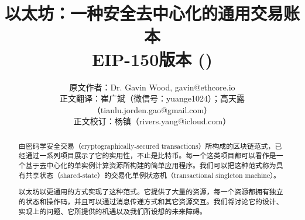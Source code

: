 \documentclass[9pt,oneside]{amsart}
\title{以太坊：一种安全去中心化的通用交易账本 \\ {\smaller \textbf{EIP-150版本 (\YellowPaperVersionNumber{})}}}
\author{
    原文作者：Dr. Gavin Wood, gavin@ethcore.io\\
    正文翻译：崔广斌（微信号：yuange1024）；高天露（tianlu.jorden.gao@gmail.com） \\
    正文校订：杨镇（rivers.yang@icloud.com）
}
\begin{document}
\pagecolor{lightyellow}

\begin{abstract}
由密码学安全交易（cryptographically-secured transactions）所构成的区块链范式，已经通过一系列项目展示了它的实用性，不止是比特币。每一个这类项目都可以看作是一个基于去中心化的单实例计算资源所构建的简单应用程序。我们可以把这种范式称为具有共享状态（shared-state）的交易化单例状态机（transactional singleton machine）。

以太坊以更通用的方式实现了这种范式。它提供了大量的资源，每一个资源都拥有独立的状态和操作码，并且可以通过消息传递方式和其它资源交互。我们将讨论它的设计、实现上的问题、它所提供的机遇以及我们所设想的未来障碍。
\end{abstract}

\maketitle
\end{document}
